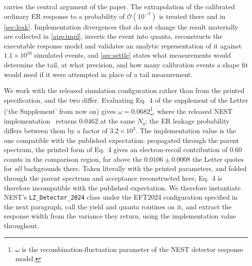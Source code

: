 \documentclass[11pt,a4paper]{article}
\begin{document}
 carries the central argument of the paper. The
extrapolation of the calibrated ordinary ER response to a probability of
\(\mathcal{O}(10^{-7})\) is treated there and in \cref{sec:leak}.
Implementation divergences that do not change the result materially are
collected in \cref{app:impl}.  inverts the event into
quanta, reconstructs the executable response model and validates an
analytic representation of it against \(1.1\times10^{10}\) simulated
events, and \cref{sec:settle} states what measurements would determine
the tail, at what precision, and how many calibration events a shape
fit would need if it were attempted in place of a tail measurement.

We work with the released simulation configuration rather than from the
printed specification, and the two differ. Evaluating Eq.~4 of the
supplement of the Letter (`the Supplement' from now on) gives
\(\omega=0.0682\)\footnote{\(\omega\) is the recombination-fluctuation
parameter of the NEST detector response model.}, where the released NEST
implementation~\cite{NESTcode,Szydagis:2022ikv} returns \(0.0462\) at
the same \(N_q\); the ER leakage probability differs between them by a
factor of \(3.2\times10^{3}\). The implementation value is the one
compatible with the published expectation: propagated through the parent
spectrum, the printed form of Eq.~4 gives an electron-recoil
contribution of \(0.60\) counts in the comparison region, far above the
\(0.0106\pm0.0008\) the Letter quotes for \emph{all} backgrounds there.
Taken literally with the printed parameters, and folded through the
parent spectrum and acceptance reconstructed here, Eq.~4 is therefore
incompatible with the published expectation. We therefore instantiate
NEST's \texttt{LZ\_Detector\_2024} class under the \textsf{EFT2024}
configuration specified in the next paragraph, call the yield and quanta
routines on it, and extract the response width from the variance they
return, using the implementation value throughout.
\end{document}
